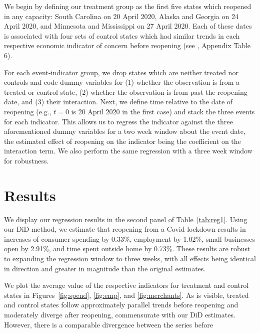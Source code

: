 \documentclass[12pt,letterpaper]{article}
\begin{document}
We begin by defining our treatment group as the first five states which reopened in any capacity: South Carolina on 20 April 2020, Alaska and Georgia on 24 April 2020, and Minnesota and Mississippi on 27 April 2020. Each of these dates is associated with four sets of control states which had similar trends in each respective economic indicator of concern before reopening (see \citeauthor{Chetty2020}, Appendix Table 6).

For each event-indicator group, we drop states which are neither treated nor controls and code dummy variables for (1) whether the observation is from a treated or control state, (2) whether the observation is from past the reopening date, and (3) their interaction. Next, we define time relative to the date of reopening (e.g., $t=0$ is 20 April 2020 in the first case) and stack the three events for each indicator. This allows us to regress the indicator against the three aforementioned dummy variables for a two week window about the event date, the estimated effect of reopening on the indicator being the coefficient on the interaction term. We also perform the same regression with a three week window for robustness.

\section*{Results}
We display our regression results in the second panel of Table~\ref{tab:reg1}. Using our DiD method, we estimate that reopening from a Covid lockdown results in increases of consumer spending by 0.33\%, employment by 1.02\%, small businesses open by 2.91\%, and time spent outside home by 0.73\%. These results are robust to expanding the regression window to three weeks, with all effects being identical in direction and greater in magnitude than the original estimates.

We plot the average value of the respective indicators for treatment and control states in Figures~\ref{fig:spend}, \ref{fig:emp}, and \ref{fig:merchants}. As is visible, treated and control states follow approximately parallel trends before reopening and moderately diverge after reopening, commensurate with our DiD estimates. However, there is a comparable divergence between the series before
\end{document}
